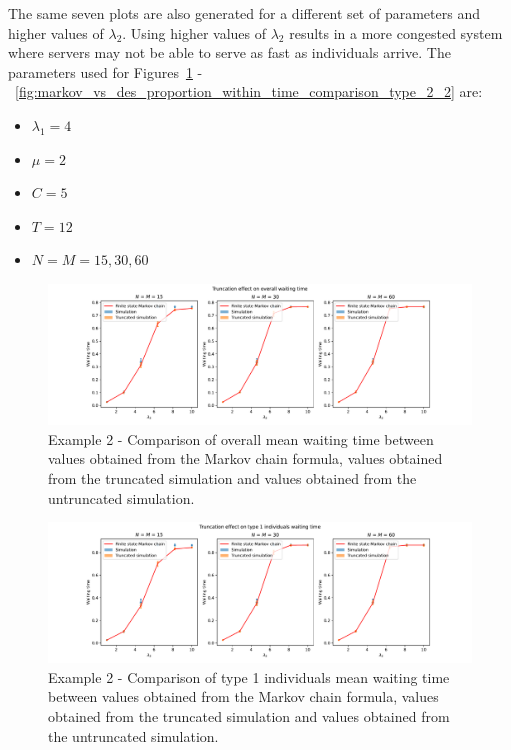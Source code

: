The same seven plots are also generated for a different set of parameters and
higher values of \(\lambda_2\).
Using higher values of \(\lambda_2\) results in a more congested system
where servers may not be able to serve as fast as individuals arrive.
The parameters used for
Figures~\ref{fig:markov_vs_des_waiting_time_comparison_overall_2}
-~\ref{fig:markov_vs_des_proportion_within_time_comparison_type_2_2} are:

\begin{itemize}
    \item \(\lambda_1 = 4\)
    \item \(\mu = 2\)
    \item \(C = 5\)
    \item \(T = 12\)
    \item \(N = M = 15, 30, 60\)
\end{itemize}

\begin{figure}[H]
    \includegraphics[width=\textwidth]{chapters/03_queueing_model/Bin/numeric_results_and_timings/truncation_effect_2/waiting_time_overall.pdf}
    \caption{
        Example 2 - Comparison of overall mean waiting time between values
        obtained from the
        Markov chain formula, values obtained from the truncated simulation and
        values obtained from the untruncated simulation.
    }
    \label{fig:markov_vs_des_waiting_time_comparison_overall_2}
\end{figure}


\begin{figure}[H]
    \includegraphics[width=\textwidth]{chapters/03_queueing_model/Bin/numeric_results_and_timings/truncation_effect_2/waiting_time_type_1.pdf}
    \caption{
        Example 2 - Comparison of type 1 individuals mean waiting time
        between values
        obtained from the Markov chain formula, values obtained from the
        truncated simulation and values obtained from the untruncated
        simulation.
    }
    \label{fig:markov_vs_des_waiting_time_comparison_type_1_2}
\end{figure}

